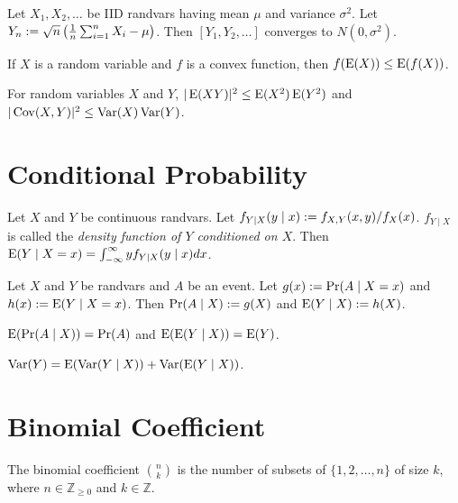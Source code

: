\documentclass[a4paper, 12pt, fleqn]{article}
\DeclareMathOperator{\Cov}{Cov}
\begin{document}
\begin{theorem}
Let $X_1, X_2, \ldots$ be IID randvars having mean $\mu$ and variance $\sigma^2$.
Let $Y_n := \sqrt{n}\left(\frac{1}{n}\sum_{i=1}^n X_i - \mu\right)$.
Then $[Y_1, Y_2, \ldots]$ converges to $N(0, \sigma^2)$.
\end{theorem}

\begin{theorem}
If $X$ is a random variable and $f$ is a convex function, then $f(\operatorname*{E}(X)) \le \operatorname*{E}(f(X))$.
\end{theorem}

\begin{theorem}
For random variables $X$ and $Y$, $|\operatorname*{E}(XY)|^2 \le \operatorname*{E}(X^2)\operatorname*{E}(Y^2)$
and $|\Cov(X,Y)|^2 \le \Var(X)\Var(Y)$.
\end{theorem}

\section{Conditional Probability}

\begin{definition}
Let $X$ and $Y$ be continuous randvars.
Let $f_{Y \mid X}(y \mid x) := f_{X,Y}(x, y) / f_X(x)$.
$f_{Y \mid X}$ is called the \emph{density function of $Y$ conditioned on $X$}.
Then $\operatorname*{E}(Y \mid X=x) = \int_{-\infty}^{\infty} y f_{Y \mid X}(y \mid x) dx$.
\end{definition}

\begin{definition}
Let $X$ and $Y$ be randvars and $A$ be an event.
Let $g(x) := \Pr(A \mid X=x)$ and $h(x) := \operatorname*{E}(Y \mid X=x)$.
Then $\Pr(A \mid X) := g(X)$ and $\operatorname*{E}(Y \mid X) := h(X)$.
\end{definition}

\begin{theorem}
$\operatorname*{E}(\Pr(A \mid X)) = \Pr(A)$ and $\operatorname*{E}(\operatorname*{E}(Y \mid X)) = \operatorname*{E}(Y)$.
\end{theorem}

\begin{theorem}
$\operatorname*{Var}(Y) = \operatorname*{E}(\operatorname*{Var}(Y \mid X)) + \operatorname*{Var}(\operatorname*{E}(Y \mid X))$.
\end{theorem}

\section{Binomial Coefficient}

The binomial coefficient $\binom{n}{k}$ is the number of subsets of $\{1, 2, \ldots, n\}$ of size $k$,
where $n \in \mathbb{Z}_{\ge 0}$ and $k \in \mathbb{Z}$.
\end{document}
